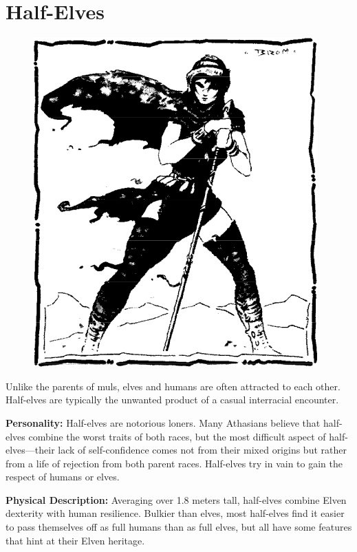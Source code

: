 \section{Half-Elves}

\begin{figure}[b!]
\centering
\includegraphics[width=\columnwidth]{images/halfelf-1.png}
\end{figure}
Unlike the parents of muls, elves and humans are often attracted to each other. Half-elves are typically the unwanted product of a casual interracial encounter.

\textbf{Personality:} Half-elves are notorious loners. Many Athasians believe that half-elves combine the worst traits of both races, but the most difficult aspect of half-elves---their lack of self-confidence comes not from their mixed origins but rather from a life of rejection from both parent races. Half-elves try in vain to gain the respect of humans or elves.

\textbf{Physical Description:} Averaging over 1.8 meters tall, half-elves combine Elven dexterity with human resilience. Bulkier than elves, most half-elves find it easier to pass themselves off as full humans than as full elves, but all have some features that hint at their Elven heritage.

